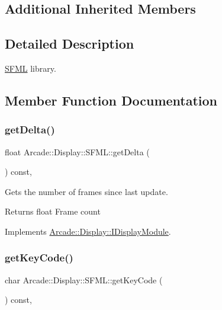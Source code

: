 \subsection*{Additional Inherited Members}


\subsection{Detailed Description}
\mbox{\hyperlink{classArcade_1_1Display_1_1SFML}{S\+F\+ML}} library. 

\subsection{Member Function Documentation}
\mbox{\label{classArcade_1_1Display_1_1SFML_ae1466db8c13b08e99ebe5ffab68884c7}} 
\subsubsection{\texorpdfstring{getDelta()}{getDelta()}}
{\footnotesize\ttfamily float Arcade\+::\+Display\+::\+S\+F\+M\+L\+::get\+Delta (\begin{DoxyParamCaption}{ }\end{DoxyParamCaption}) const\hspace{0.3cm}{\ttfamily [final]}, {\ttfamily [virtual]}}



Gets the number of frames since last update. 

\begin{DoxyReturn}{Returns}
float Frame count 
\end{DoxyReturn}


Implements \mbox{\hyperlink{classArcade_1_1Display_1_1IDisplayModule_aab078d82e6fdd32682553947c20226ac}{Arcade\+::\+Display\+::\+I\+Display\+Module}}.

\mbox{\label{classArcade_1_1Display_1_1SFML_ae2bf9e9c157a9f0ae8d1b60bd072e881}} 
\subsubsection{\texorpdfstring{getKeyCode()}{getKeyCode()}}
{\footnotesize\ttfamily char Arcade\+::\+Display\+::\+S\+F\+M\+L\+::get\+Key\+Code (\begin{DoxyParamCaption}{ }\end{DoxyParamCaption}) const\hspace{0.3cm}{\ttfamily [final]}, {\ttfamily [virtual]}}



